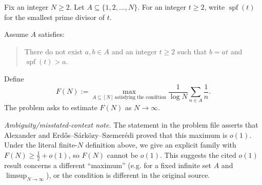 Fix an integer $N\ge 2$. Let $A\subseteq \{1,2,\dots,N\}$. For an integer $t\ge 2$, write $\operatorname{spf}(t)$ for the smallest prime divisor of $t$.

Assume $A$ satisfies:
\begin{quote}
There do not exist $a,b\in A$ and an integer $t\ge 2$ such that $b=a t$ and $\operatorname{spf}(t)>a$.
\end{quote}
Define
\[
F(N):= \max_{A\subseteq [N]\ \text{satisfying the condition}} \frac{1}{\log N}\sum_{n\in A}\frac{1}{n}.
\]
The problem asks to estimate $F(N)$ as $N\to\infty$.

\emph{Ambiguity/misstated-context note.}
The statement in the problem file asserts that Alexander and Erd\H{o}s--S\'ark\"ozy--Szemer\'edi proved that this maximum is $o(1)$. Under the literal finite-$N$ definition above, we give an explicit family with $F(N)\ge \tfrac12+o(1)$, so $F(N)$ cannot be $o(1)$. This suggests the cited $o(1)$ result concerns a different ``maximum'' (e.g. for a fixed infinite set $A$ and $\limsup_{N\to\infty}$), or the condition is different in the original source.
